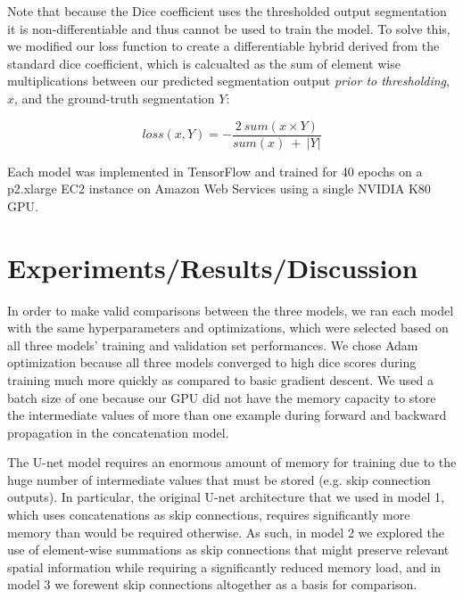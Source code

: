 \documentclass{article}
\newcommand\tab[1][0.5cm]{\hspace*{#1}}
\begin{document}
Note that because the Dice coefficient uses the thresholded output segmentation it is non-differentiable and thus cannot be used to train the model. To solve this, we modified our loss function to create a differentiable hybrid derived from the standard dice coefficient, which is calcualted as the sum of element wise multiplications between our predicted segmentation output \textit{prior to thresholding}, $x$, and the ground-truth segmentation $Y$:

\begin{equation}
loss(x, Y) = -\frac{2 \ sum(x \times Y)}{sum(x) \ + \ |Y|}
\end{equation}

Each model was implemented in TensorFlow \cite{tensorflow2015-whitepaper} and trained for 40 epochs on a p2.xlarge EC2 instance on Amazon Web Services using a single NVIDIA K80 GPU.

\section{Experiments/Results/Discussion}

\tab In order to make valid comparisons between the three models, we ran each model with the same hyperparameters and optimizations, which were selected based on all three models' training and validation set performances. We chose Adam optimization because all three models converged to high dice scores during training much more quickly as compared to basic gradient descent. We used a batch size of one because our GPU did not have the memory capacity to store the intermediate values of more than one example during forward and backward propagation in the concatenation model.

	The U-net model requires an enormous amount of memory for training due to the huge number of intermediate values that must be stored (e.g. skip connection outputs). In particular, the original U-net architecture that we used in model 1, which uses concatenations as skip connections, requires significantly more memory than would be required otherwise. As such, in model 2 we explored the use of element-wise summations as skip connections that might preserve relevant spatial information while requiring a significantly reduced memory load, and in model 3 we forewent skip connections altogether as a basis for comparison.
    
\end{document}
